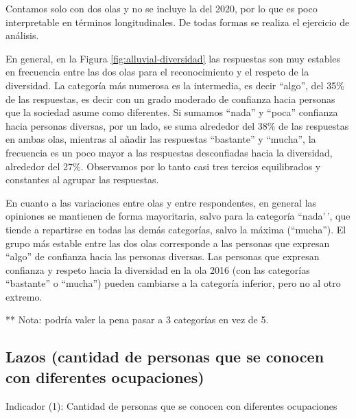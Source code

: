 \documentclass[
  12pt,
]{book}
\begin{document}
Contamos solo con dos olas y no se incluye la del 2020, por lo que es poco interpretable en términos longitudinales. De todas formas se realiza el ejercicio de análisis.

En general, en la Figura \ref{fig:alluvial-diversidad} las respuestas son muy estables en frecuencia entre las dos olas para el reconocimiento y el respeto de la diversidad. La categoría más numerosa es la intermedia, es decir ``algo'', del 35\% de las respuestas, es decir con un grado moderado de confianza hacia personas que la sociedad asume como diferentes. Si sumamos ``nada'' y ``poca'' confianza hacia personas diversas, por un lado, se suma alrededor del 38\% de las respuestas en ambas olas, mientras al añadir las respuestas ``bastante'' y ``mucha'', la frecuencia es un poco mayor a las respuestas desconfiadas hacia la diversidad, alrededor del 27\%. Observamos por lo tanto casi tres tercios equilibrados y constantes al agrupar las respuestas.

En cuanto a las variaciones entre olas y entre respondentes, en general las opiniones se mantienen de forma mayoritaria, salvo para la categoría ``nada'\,', que tiende a repartirse en todas las demás categorías, salvo la máxima (``mucha''). El grupo más estable entre las dos olas corresponde a las personas que expresan ``algo'' de confianza hacia las personas diversas. Las personas que expresan confianza y respeto hacia la diversidad en la ola 2016 (con las categorías ``bastante'' o ``mucha'') pueden cambiarse a la categoría inferior, pero no al otro extremo.

** Nota: podría valer la pena pasar a 3 categorías en vez de 5.

\hypertarget{lazos-cantidad-de-personas-que-se-conocen-con-diferentes-ocupaciones}{%
\subsection{Lazos (cantidad de personas que se conocen con diferentes ocupaciones)}\label{lazos-cantidad-de-personas-que-se-conocen-con-diferentes-ocupaciones}}

Indicador (1): Cantidad de personas que se conocen con diferentes ocupaciones
\end{document}
